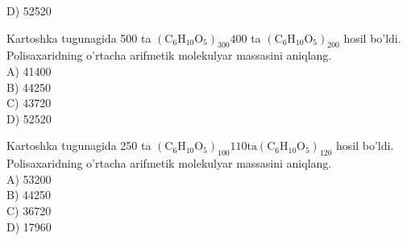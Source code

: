D) 52520
  \item Kartoshka tugunagida 500 ta $\left(\mathrm{C}_{6} \mathrm{H}_{10} \mathrm{O}_{5}\right)_{300} 400$ ta $\left(\mathrm{C}_{6} \mathrm{H}_{10} \mathrm{O}_{5}\right)_{200}$ hosil bo'ldi. Polisaxaridning o'rtacha arifmetik molekulyar massasini aniqlang.\\
A) 41400\\
B) 44250\\
C) 43720\\
D) 52520
  \item Kartoshka tugunagida 250 ta $\left(\mathrm{C}_{6} \mathrm{H}_{10} \mathrm{O}_{5}\right)_{100} 110 \mathrm{ta}\left(\mathrm{C}_{6} \mathrm{H}_{10} \mathrm{O}_{5}\right)_{120}$ hosil bo'ldi. Polisaxaridning o'rtacha arifmetik molekulyar massasini aniqlang.\\
A) 53200\\
B) 44250\\
C) 36720\\
D) 17960